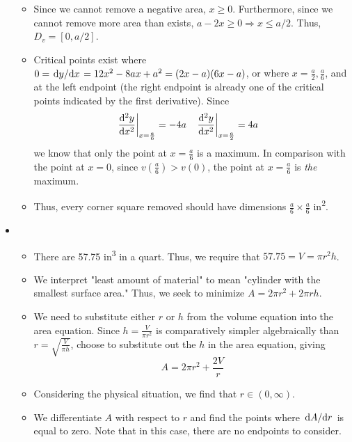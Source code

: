 \documentclass[../main.tex]{subfiles}
\begin{document}
\begin{itemize}
\begin{itemize}
\begin{equation*}
        \end{equation*}
        \item Since we cannot remove a negative area, $x\geq 0$. Furthermore, since we cannot remove more area than exists, $a-2x\geq 0 \Rightarrow x\leq a/2$. Thus, $D_v=[0,a/2]$.
        \item Critical points exist where $0=\dv*{y}{x}=12x^2-8ax+a^2=(2x-a)(6x-a)$, or where $x=\frac{a}{2},\frac{a}{6}$, and at the left endpoint (the right endpoint is already one of the critical points indicated by the first derivative). Since
        \begin{align*}
            \left. \dv[2]{y}{x} \right|_{x=\frac{a}{6}} &= -4a&
            \left. \dv[2]{y}{x} \right|_{x=\frac{a}{2}} &= 4a
        \end{align*}
        we know that only the point at $x=\frac{a}{6}$ is a maximum. In comparison with the point at $x=0$, since $v\left( \frac{a}{6} \right)>v(0)$, the point at $x=\frac{a}{6}$ is \emph{the} maximum.
        \item Thus, every corner square removed should have dimensions $\frac{a}{6}\times\frac{a}{6}$ in\textsuperscript{2}.
    \end{itemize}
    \item {}
    \begin{itemize}
        \item There are 57.75 in\textsuperscript{3} in a quart. Thus, we require that $57.75=V=\pi r^2h$.
        \item We interpret "least amount of material" to mean "cylinder with the smallest surface area." Thus, we seek to minimize $A=2\pi r^2+2\pi rh$.
        \item We need to substitute either $r$ or $h$ from the volume equation into the area equation. Since $h=\frac{V}{\pi r^2}$ is comparatively simpler algebraically than $r=\sqrt{\frac{V}{\pi h}}$, choose to substitute out the $h$ in the area equation, giving
        \begin{equation*}
            A = 2\pi r^2+\frac{2V}{r}
        \end{equation*}
        \item Considering the physical situation, we find that $r\in(0,\infty)$.
        \item We differentiate $A$ with respect to $r$ and find the points where $\dv*{A}{r}$ is equal to zero. Note that in this case, there are no endpoints to consider.

\end{itemize}
\end{itemize}
\end{document}
